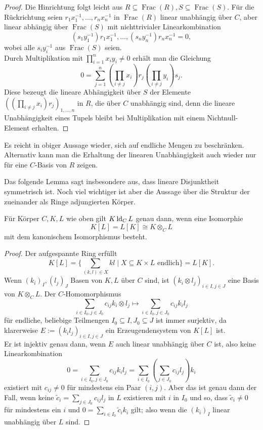     \begin{proof}
    	Die Hinrichtung folgt leicht aus $R\subseteq\operatorname{Frac}(R),S\subseteq\operatorname{Frac}(S)$. Für die Rückrichtung seien $r_1x_1^{-1},\dots,r_nx_n^{-1}$ in $\operatorname{Frac}(R)$ linear unabhängig über $C$, aber linear abhängig über $\operatorname{Frac}(S)$ mit nichttrivialer Linearkombination $$(s_1y_1^{-1})r_1x_1^{-1},\dots,(s_ny_n^{-1})r_nx_n^{-1}=0,$$ wobei alle $s_iy_i^{-1}$ aus $\operatorname{Frac}(S)$ seien.\\
    	Durch Multiplikation mit $\prod\limits_{i=1}^nx_iy_i\neq0$ erhält man die Gleichung $$0=\sum\limits_{j=1}^n(\prod\limits_{i\neq j}x_i)r_j(\prod\limits_{i\neq j}y_i)s_j.$$ Diese bezeugt die lineare Abhängigkeit über $S$ der Elemente $((\prod\limits_{i\neq j}x_i)r_j)_{1,\dots,n}$ in $R$, die über $C$ unabhängig sind, denn die lineare Unabhängigkeit eines Tupels bleibt bei Multiplikation mit einem Nichtnull-Element erhalten.
    \end{proof}
    
    \begin{remark}
    	Es reicht in obiger Aussage wieder, sich auf endliche Mengen zu beschränken. Alternativ kann man die Erhaltung der linearen Unabhängigkeit auch wieder nur für eine $C$-Basis von $R$ zeigen.
    \end{remark}
    
    Das folgende Lemma sagt insbesondere aus, dass lineare Disjunktheit symmetrisch ist. Noch viel wichtiger ist aber die Aussage über die Struktur der zueinander als Ringe adjungierten Körper.
    
    \begin{lemma}\label{Tensoren}
    	Für Körper $C,K,L$ wie oben gilt $K\operatorname{ld}_CL$ genau dann, wenn eine Isomorphie $$K[L]=L[K]\cong K\otimes_CL$$ mit dem kanonischem Isomorphismus besteht.
    \end{lemma}
    \begin{proof}
    	Der aufgespannte Ring erfüllt $$K[L]=\{\sum\limits_{(k,l)\in X}kl\mid X\subseteq K\times L\text{ endlich}\}=L[K].$$
    	Wenn $(k_i)_I,(l_j)_J$ Basen von $K,L$ über $C$ sind, ist $(k_i\otimes l_j)_{i\in I,j\in J}$ eine Basis von $K\otimes_CL$.\newpage
    	Der $C$-Homomorphismus $$\sum\limits_{i\in I_0,j\in J_0} c_{ij}k_i\otimes l_j\mapsto \sum\limits_{i\in I_0,j\in J_0} c_{ij}k_il_j$$ für endliche, beliebige Teilmengen $I_0\subseteq I,J_0\subseteq J$ ist immer surjektiv, da klarerweise $E:=(k_il_j)_{i\in I,j\in J}$ ein Erzeugendensystem von $K[L]$ ist.\\
    	Er ist injektiv genau dann, wenn $E$ auch linear unabhängig über $C$ ist, also keine Linearkombination $$0=\sum\limits_{i\in I_0,j\in J_0}c_{ij}k_il_j=\sum\limits_{i\in I_0}(\sum\limits_{j\in J_0}c_{ij}l_j)k_i$$ existiert mit $c_{ij}\neq0$ für mindestens ein Paar $(i,j)$. Aber das ist genau dann der Fall, wenn keine $\tilde{c}_i=\sum\limits_{j\in J_0}c_{ij}l_j$ in $L$ existieren mit $i$ in $I_0$ und so, dass $\tilde{c}_i\neq0$ für mindestens ein $i$ und $0=\sum\limits_{i\in I_0}\tilde{c}_ik_i$ gilt; also wenn die $(k_i)_I$ linear unabhängig über $L$ sind.
    \end{proof}
    
